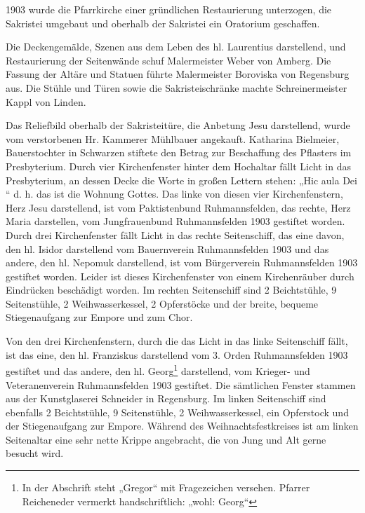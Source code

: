 \documentclass[12pt,a4paper]{book}
\begin{document}
1903 wurde die Pfarrkirche einer gründlichen Restaurierung unterzogen, die
Sakristei umgebaut und oberhalb der Sakristei ein Oratorium geschaffen.

Die Deckengemälde, Szenen aus dem Leben des hl. Laurentius darstellend, und
Restaurierung der Seitenwände schuf Malermeister Weber von Amberg. Die Fassung
der Altäre und Statuen führte Malermeister Boroviska von Regensburg aus. Die
Stühle und Türen sowie die Sakristeischränke machte Schreinermeister Kappl von
Linden.

Das Reliefbild oberhalb der Sakristeitüre, die Anbetung Jesu darstellend, wurde
vom verstorbenen Hr. Kammerer Mühlbauer angekauft. Katharina Bielmeier,
Bauerstochter in Schwarzen stiftete den Betrag zur Beschaffung des Pflasters im
Presbyterium. Durch vier Kirchenfenster hinter dem Hochaltar fällt Licht in das
Presbyterium, an dessen Decke die Worte in großen Lettern stehen: „Hic aula Dei
“ d. h. das ist die Wohnung Gottes. Das linke von diesen vier Kirchenfenstern,
Herz Jesu darstellend, ist vom Paktistenbund Ruhmannsfelden, das rechte, Herz
Maria darstellen, vom Jungfrauenbund Ruhmannsfelden 1903 gestiftet worden. Durch
drei Kirchenfenster fällt Licht in das rechte Seitenschiff, das eine davon, den
hl. Isidor darstellend vom Bauernverein Ruhmannsfelden 1903 und das andere, den
hl. Nepomuk darstellend, ist vom Bürgerverein Ruhmannsfelden 1903 gestiftet
worden. Leider ist dieses Kirchenfenster von einem Kirchenräuber durch
Eindrücken beschädigt worden. Im rechten Seitenschiff sind 2 Beichtstühle, 9
Seitenstühle, 2 Weihwasserkessel, 2 Opferstöcke und der breite, bequeme
Stiegenaufgang zur Empore und zum Chor.

Von den drei Kirchenfenstern, durch die das Licht in das linke Seitenschiff
fällt, ist das eine, den hl. Franziskus darstellend vom 3. Orden Ruhmannsfelden
1903 gestiftet und das andere, den hl. Georg\footnote{In der Abschrift steht
„Gregor“ mit Fragezeichen versehen. Pfarrer Reicheneder vermerkt
handschriftlich: „wohl: Georg“} darstellend, vom Krieger- und Veteranenverein
Ruhmannsfelden 1903 gestiftet. Die sämtlichen Fenster stammen aus der
Kunstglaserei Schneider in Regensburg. Im linken Seitenschiff sind ebenfalls 2
Beichtstühle, 9 Seitenstühle, 2 Weihwasserkessel, ein Opferstock und der
Stiegenaufgang zur Empore. Während des Weihnachtsfestkreises ist am linken
Seitenaltar eine sehr nette Krippe angebracht, die von Jung und Alt gerne
besucht wird.
\end{document}
